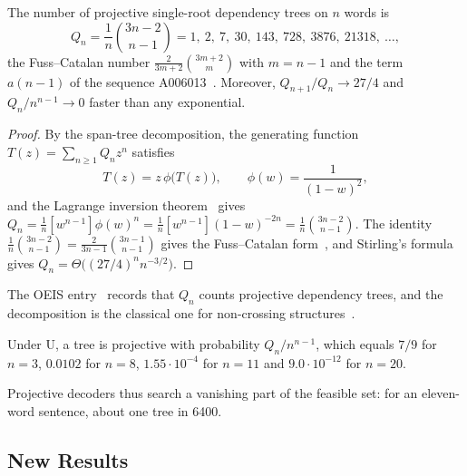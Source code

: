 \documentclass[mathematics,article,submit,pdftex,oneauthor]{Definitions/mdpi}
\begin{document}
\begin{Lemma}\label{lem:projective}
The number of projective single-root dependency trees on $n$ words is
\begin{equation}\label{eq:projective}
Q_n=\frac{1}{n}\binom{3n-2}{n-1}=1,\ 2,\ 7,\ 30,\ 143,\ 728,\ 3876,\ 21318,\ \dots,
\end{equation}
the Fuss--Catalan number $\frac{2}{3m+2}\binom{3m+2}{m}$ with $m=n-1$ and the term $a(n-1)$ of the sequence A006013~\cite{OEIS_A006013}.
Moreover, $Q_{n+1}/Q_n\to 27/4$ and $Q_n/n^{n-1}\to0$ faster than any exponential.
\end{Lemma}
\begin{proof}
By the span-tree decomposition, the generating function $T(z)=\sum_{n\geqslant1}Q_nz^n$ satisfies
\begin{equation}\label{eq:gf}
T(z)=z\,\phi\bigl(T(z)\bigr),\qquad \phi(w)=\frac{1}{(1-w)^2},
\end{equation}
and the Lagrange inversion theorem~\cite{FlajoletSedgewick2009} gives $Q_n=\frac1n[w^{n-1}]\phi(w)^n=\frac1n[w^{n-1}](1-w)^{-2n}=\frac1n\binom{3n-2}{n-1}$.
The identity $\frac1n\binom{3n-2}{n-1}=\frac{2}{3n-1}\binom{3n-1}{n-1}$ gives the Fuss--Catalan form~\cite{Qi2018FussCatalan}, and Stirling's formula gives $Q_n=\Theta\bigl((27/4)^nn^{-3/2}\bigr)$.
\end{proof}

The OEIS entry~\cite{OEIS_A006013} records that $Q_n$ counts projective dependency trees, and the decomposition is the classical one for non-crossing structures~\cite{FlajoletNoy1999}.

\begin{Corollary}\label{cor:projective}
Under U, a tree is projective with probability $Q_n/n^{n-1}$, which equals $7/9$ for $n=3$, $0.0102$ for $n=8$, $1.55\cdot10^{-4}$ for $n=11$ and $9.0\cdot10^{-12}$ for $n=20$.
\end{Corollary}

Projective decoders thus search a vanishing part of the feasible set: for an eleven-word sentence, about one tree in 6400.

\subsection{New Results}\label{sec:new}
\end{document}
